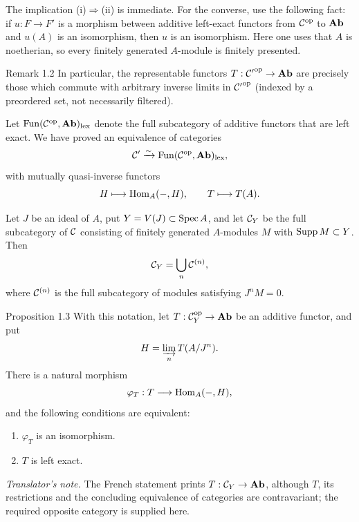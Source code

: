 The implication (i)$\Rightarrow$(ii) is immediate. For the converse, use the
following fact: if $u:F\to F'$ is a morphism between additive left-exact
functors from $\mathcal C^{\mathrm{op}}$ to $\mathbf{Ab}$ and $u(A)$ is an isomorphism,
then $u$ is an isomorphism. Here one uses that $A$ is noetherian, so every
finitely generated $A$-module is finitely presented.

\begin{sgastatement}{Remark 1.2}
In particular, the representable functors
$T:{\mathcal C'}^{\mathrm{op}}\to\mathbf{Ab}$ are precisely those which commute with
arbitrary inverse limits in ${\mathcal C'}^{\mathrm{op}}$ (indexed by a
preordered set, not necessarily filtered).
\end{sgastatement}

Let $\operatorname{Fun}(\mathcal C^{\mathrm{op}},\mathbf{Ab})_{\mathrm{lex}}$ denote the
full subcategory of additive functors that are left exact. We have proved an
equivalence of categories
\[
  \mathcal C'\xrightarrow{\sim}
  \operatorname{Fun}(\mathcal C^{\mathrm{op}},\mathbf{Ab})_{\mathrm{lex}},
\]
with mutually quasi-inverse functors
\[
  H\longmapsto\operatorname{Hom}_A(-,H),
  \qquad
  T\longmapsto T(A).
\]


Let $J$ be an ideal of $A$, put $Y=V(J)\subset\operatorname{Spec} A$, and let
$\mathcal C_Y$ be the full subcategory of $\mathcal C$ consisting of finitely generated
$A$-modules $M$ with $\operatorname{Supp} M\subset Y$. Then
\[
  \mathcal C_Y=\bigcup_n\mathcal C^{(n)},
\]
where $\mathcal C^{(n)}$ is the full subcategory of modules satisfying $J^nM=0$.

\begin{sgastatement}{Proposition 1.3}
With this notation, let
$T:\mathcal C_Y^{\mathrm{op}}\to\mathbf{Ab}$ be an additive functor, and put
\[
  H=\varinjlim_n T(A/J^n).
\]
There is a natural morphism
\[
  \varphi_T:T\longrightarrow\operatorname{Hom}_A(-,H),
\]
and the following conditions are equivalent:
\begin{enumerate}[label=\textup{\roman*)},leftmargin=2.7em]
\item $\varphi_T$ is an isomorphism.
\item $T$ is left exact.
\end{enumerate}
\end{sgastatement}

\noindent\textit{Translator's note.} The French statement prints
$T:\mathcal C_Y\to\mathbf{Ab}$, although $T$, its restrictions and the concluding
equivalence of categories are contravariant; the required opposite category
is supplied here.

